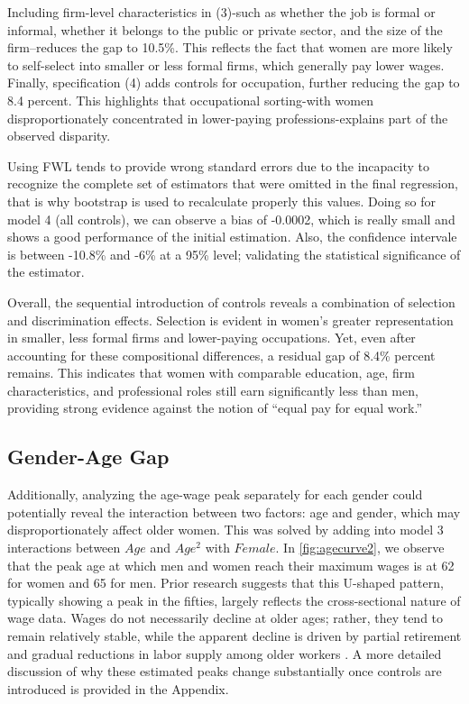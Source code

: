 \documentclass[12pt,a4paper,onecolumn]{article}
\begin{document}
Including firm-level characteristics in (3)-such as whether the job is formal or informal, whether it belongs to the public or private sector, and the size of the firm--reduces the gap to 10.5\%. This reflects the fact that women are more likely to self-select into smaller or less formal firms, which generally pay lower wages. Finally, specification (4) adds controls for occupation, further reducing the gap to 8.4 percent. This highlights that occupational sorting-with women disproportionately concentrated in lower-paying professions-explains part of the observed disparity. 

Using FWL tends to provide wrong standard errors due to the incapacity to recognize the complete set of estimators that were omitted in the final regression, that is why bootstrap is used to recalculate properly this values. Doing so for model 4 (all controls), we can observe a bias of -0.0002, which is really small and shows a good performance of the initial estimation. Also, the confidence intervale is between -10.8\% and -6\% at a 95\% level; validating the statistical significance of the estimator.

Overall, the sequential introduction of controls reveals a combination of selection and discrimination effects. Selection is evident in women's greater representation in smaller, less formal firms and lower-paying occupations. Yet, even after accounting for these compositional differences, a residual gap of 8.4\% percent remains. This indicates that women with comparable education, age, firm characteristics, and professional roles still earn significantly less than men, providing strong evidence against the notion of ``equal pay for equal work.''

\subsection{Gender-Age Gap} 

Additionally, analyzing the age-wage peak separately for each gender could potentially reveal the interaction between two factors: age and gender, which may disproportionately affect older women. This was solved by adding into model 3 interactions between $Age$ and $Age^2$ with $Female$. In \autoref{fig:agecurve2}, we observe that the peak age at which men and women reach their maximum wages is at 62 for women and 65 for men. Prior research suggests that this U-shaped pattern, typically showing a peak in the fifties, largely reflects the cross-sectional nature of wage data. Wages do not necessarily decline at older ages; rather, they tend to remain relatively stable, while the apparent decline is driven by partial retirement and gradual reductions in labor supply among older workers \citep{Luong2009, Casanova2012, Scarfe2023}. A more detailed discussion of why these estimated peaks change substantially once controls are introduced is provided in the Appendix.
\end{document}
